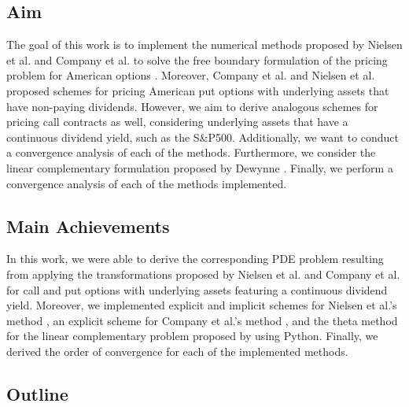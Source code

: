 \subsection{Aim} 

The goal of this work is to implement the numerical methods proposed by Nielsen et al. \cite{nielsen_2001} and Company et al. \cite{company_egorova_jodar_2014} to solve the free boundary formulation of the pricing problem for American options \cite{dewynne_howison_rupf_wilmott_1993}. Moreover, Company et al. \cite{company_egorova_jodar_2014} and Nielsen et al. \cite{nielsen_2001} proposed schemes for pricing American put options with underlying assets that have non-paying dividends. However, we aim to derive analogous schemes for pricing call contracts as well, considering underlying assets that have a continuous dividend yield, such as the S\&P500. Additionally, we want to conduct a convergence analysis of each of the methods. Furthermore, we consider the linear complementary formulation proposed by Dewynne \cite{dewynne_howison_rupf_wilmott_1993} \cite{wilmott_howison_dewynne_1995}. Finally, we perform a convergence analysis of each of the methods implemented.

\subsection{Main Achievements}

In this work, we were able to derive the corresponding PDE problem resulting from applying the transformations proposed by Nielsen et al. \cite{nielsen_2001} and Company et al. \cite{company_egorova_jodar_2014} for call and put options with underlying assets featuring a continuous dividend yield. Moreover, we implemented explicit and implicit schemes for Nielsen et al.'s method \cite{nielsen_2001}, an explicit scheme for Company et al.'s method \cite{company_egorova_jodar_2014}, and the theta method for the linear complementary problem proposed by \cite{wilmott_howison_dewynne_1995} using Python. Finally, we derived the order of convergence for each of the implemented methods.

\subsection{Outline}

